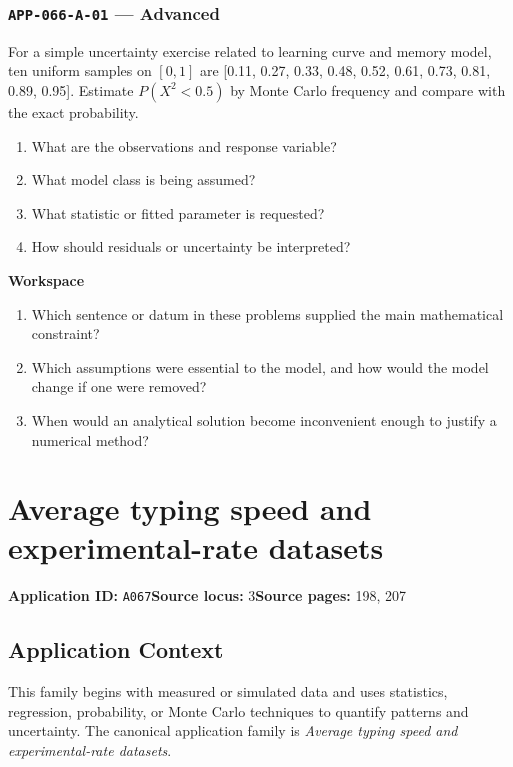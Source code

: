 \documentclass[11pt]{book}
\newcommand{\pid}[1]{\texttt{#1}}
\newcommand{\workspace}{\par\vspace{0.7in}\hrulefill\par\vspace{0.55in}\hrulefill\par}
\begin{document}
\subsection*{\pid{APP-066-A-01} — Advanced}
\begin{problembox}
For a simple uncertainty exercise related to learning curve and memory model, ten uniform samples on $[0,1]$ are [0.11, 0.27, 0.33, 0.48, 0.52, 0.61, 0.73, 0.81, 0.89, 0.95]. Estimate $P(X^2<0.5)$ by Monte Carlo frequency and compare with the exact probability.
\end{problembox}
\begin{promptbox}\begin{enumerate}
\item What are the observations and response variable?
\item What model class is being assumed?
\item What statistic or fitted parameter is requested?
\item How should residuals or uncertainty be interpreted?
\end{enumerate}\end{promptbox}
\textbf{Workspace}\workspace
\begin{reflectionbox}\begin{enumerate}
\item Which sentence or datum in these problems supplied the main mathematical constraint?
\item Which assumptions were essential to the model, and how would the model change if one were removed?
\item When would an analytical solution become inconvenient enough to justify a numerical method?
\end{enumerate}\end{reflectionbox}
\chapter{Average typing speed and experimental-rate datasets}\label{app:A067}
\textbf{Application ID:} \pid{A067}\quad \textbf{Source locus:} 3\quad \textbf{Source pages:} 198, 207
\section*{Application Context}
This family begins with measured or simulated data and uses statistics, regression, probability, or Monte Carlo techniques to quantify patterns and uncertainty. The canonical application family is \emph{Average typing speed and experimental-rate datasets}.
\end{document}
